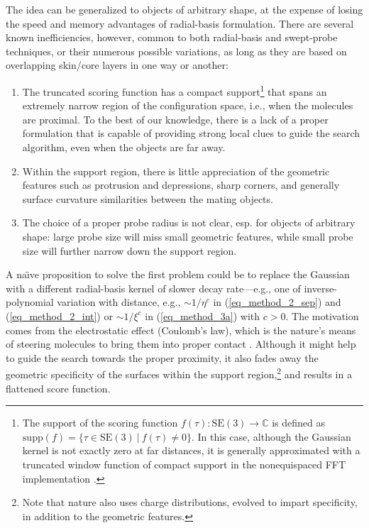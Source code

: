\documentclass[article]{gmp2014}
\theoremstyle{definition}
\begin{document}
The idea can be generalized to objects of arbitrary shape, at the expense of losing the speed and memory advantages of radial-basis formulation. There are several known inefficiencies, however, common to both radial-basis and swept-probe techniques, or their numerous possible variations, as long as they are based on overlapping skin/core layers in one way or another:
%
\begin{enumerate}
    \item The truncated scoring function has a compact support\footnote{The support of the scoring function $f(\tau): \mathrm{SE}(3) \rightarrow \mathds{C}$ is defined as $\mathrm{supp}(f) = \{ \tau \in \mathrm{SE}(3) ~|~ f(\tau) \neq 0 \}$. In this case, although the Gaussian kernel is not exactly zero at far distances, it is generally approximated with a truncated window function of compact support in the nonequispaced FFT implementation \cite{Potts2001}.} that spans an extremely narrow region of the configuration space, i.e., when the molecules are proximal. To the best of our knowledge, there is a lack of a proper formulation that is capable of providing strong local clues to guide the search algorithm, even when the objects are far away.
    \item Within the support region, there is little appreciation of the geometric features such as protrusion and depressions, sharp corners, and generally surface curvature similarities between the mating objects.
    \item The choice of a proper probe radius is not clear, esp. for objects of arbitrary shape: large probe size will miss small geometric features, while small probe size will further narrow down the support region.
\end{enumerate}
%
A na\"{\i}ve proposition to solve the first problem could be to replace the Gaussian with a different radial-basis kernel of slower decay rate---e.g., one of inverse-polynomial variation with distance, e.g., $\sim 1/\eta^c$ in (\ref{eq_method_2_sep}) and (\ref{eq_method_2_int}) or $\sim 1/\xi^c$ in (\ref{eq_method_3a}) with $c > 0$. The motivation comes from the electrostatic effect (Coulomb's law), which is the nature's means of steering molecules to bring them into proper contact \cite{Kuriyan2012}. Although it might help to guide the search towards the proper proximity, it also fades away the geometric specificity of the surfaces within the support region,\footnote{Note that nature also uses charge distributions, evolved to impart specificity, in addition to the geometric features.} and results in a flattened score function.
\end{document}
